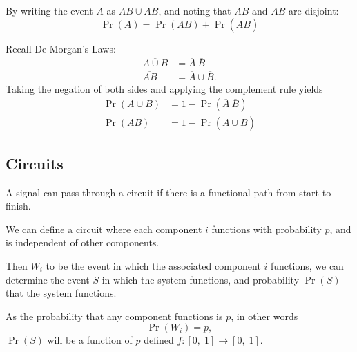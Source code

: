 \documentclass{article}
\begin{document}
\begin{theorem}
    By writing the event \(A\) as \(AB \cup A\overline{B}\), and noting that \(AB\) and \(A\overline{B}\) are disjoint:
    \begin{equation*}
        \Pr{\left( A \right)} = \Pr{\left( AB \right)} + \Pr{\left( A\overline{B} \right)}
    \end{equation*}
\end{theorem}
\begin{theorem}
    Recall De Morgan's Laws:
    \begin{align*}
        \overline{A \cup B} & = \overline{A} \ \overline{B}     \\
        \overline{AB}       & = \overline{A} \cup \overline{B}.
    \end{align*}
    Taking the negation of both sides and applying the complement rule yields
    \begin{align*}
        \Pr{\left( A \cup B \right)} & = 1 - \Pr{\left( \overline{A} \ \overline{B} \right)}    \\
        \Pr{\left( AB \right)}       & = 1 - \Pr{\left( \overline{A} \cup \overline{B} \right)}
    \end{align*}
\end{theorem}
\subsection{Circuits}
A signal can pass through a circuit if there is a functional path from start to finish.

We can define a circuit where each component \(i\) functions with probability \(p\), 
and is independent of other components.

Then \(W_i\) to be the event in which the associated component \(i\) functions, we can 
determine the event \(S\) in which the system functions,
and probability \(\Pr{\left( S \right)}\) that the system functions.

As the probability that any component functions is \(p\), in other words
\begin{equation*}
    \Pr{\left( W_i \right)} = p,
\end{equation*}
\(\Pr{\left( S \right)}\) will be a function of \(p\) defined \(f:\left[ 0,\; 1 \right] \to \left[ 0,\; 1 \right]\).
\end{document}
